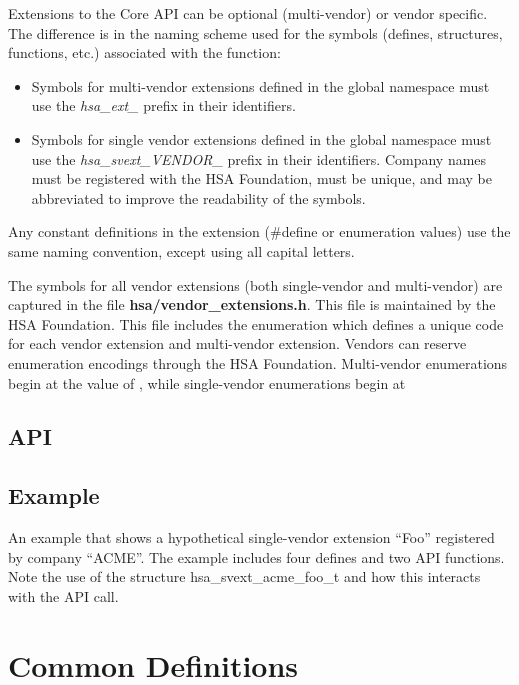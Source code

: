 \documentclass[final]{book}
\newcommand{\reftyp}[1]{#1}
\begin{document}
Extensions to the Core API can be optional (multi-vendor) or vendor
specific. The difference is in the naming scheme used for the symbols (defines,
structures, functions, etc.) associated with the function:

\begin{itemize}
\item Symbols for multi-vendor extensions defined in the global namespace must
  use the \emph{hsa_ext_} prefix in their identifiers.
\item Symbols for single vendor extensions defined in the global namespace must
  use the \emph{hsa_svext_VENDOR_} prefix in their identifiers. Company names
  must be registered with the HSA Foundation, must be unique, and may be
  abbreviated to improve the readability of the symbols.
\end{itemize}

Any constant definitions in the extension (\#define or enumeration values) use
the same naming convention, except using all capital letters.

The symbols for all vendor extensions (both single-vendor and multi-vendor) are
captured in the file {\bf hsa/vendor_extensions.h}. This file is maintained by
the HSA Foundation. This file includes the enumeration 
which defines a unique code for each vendor extension and multi-vendor
extension. Vendors can reserve enumeration encodings through the HSA
Foundation. Multi-vendor enumerations begin at the value of
, while single-vendor enumerations begin at

\subsection{API}


\subsection{Example}
An example that shows a hypothetical single-vendor extension ``Foo'' registered
by company ``ACME''. The example includes four defines and two API functions.
Note the use of the structure \reftyp{hsa_svext_acme_foo_t} and how this
interacts with the  API call.



\section{Common Definitions}\label{sec:other}

%
\end{document}
